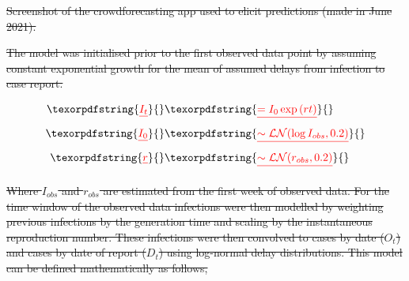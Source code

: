 \documentclass[10pt,letterpaper]{article}
\providecommand{\DIFdeltex}[1]{{\protect\color{red}\sout{#1}}}                      %
\providecommand{\DIFdelFL}[1]{\DIFdel{#1}} %
\providecommand{\DIFdel}[1]{\texorpdfstring{\DIFdeltex{#1}}{}} %
\begin{document}
{%
\DIFdelFL{Screenshot of the crowdforecasting app used to elicit predictions (made in June 2021). }}%




\DIFdel{The model was initialised prior to the first observed data point by
assuming constant exponential growth for the mean of assumed delays from
infection to case report.
}%

\begin{align*}
  \DIFdel{I_{t} }&\DIFdel{= I_0 \exp  \left(r t \right)  }\\
  \DIFdel{I_0 }&\DIFdel{\sim \mathcal{LN}(\log I_{obs}, 0.2) }\\
  \DIFdel{r }&\DIFdel{\sim \mathcal{LN}(r_{obs}, 0.2) 
}\end{align*}%

\DIFdel{Where \(I_{obs}\) and \(r_{obs}\) are estimated from the first week of
observed data. For the time window of the observed data infections were
then modelled by weighting previous infections by the generation time
and scaling by the instantaneous reproduction number. These infections
were then convolved to cases by date (\(O_t\)) and cases by date of
report (\(D_t\)) using log-normal delay distributions. This model can be
defined mathematically as follows,
}%
\end{document}
